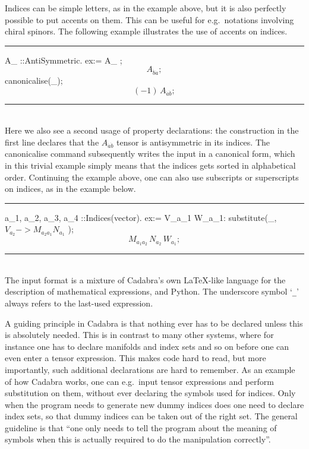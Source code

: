 \documentclass[11pt]{article}
\newcommand{\toprule}{\par\vspace{1ex}\noindent\hspace{25pt}\rule{435pt}{.1pt}}
\newcommand{\botrule}{\noindent\hspace{25pt}\rule{435pt}{.1pt}\\[2ex]}
\newenvironment{cdbin}{\fvset{firstnumber=1}\color[named]{Blue}\Verbatim}{\endVerbatim}
\newenvironment{cdbcont}{\fvset{firstnumber=last}\color[named]{Blue}\Verbatim}{\endVerbatim}
\newenvironment{cdbout}{\vspace{-1.4ex}\begin{equation}}{\end{equation}\vspace{-1.4ex}}
\newcommand{\Cdb}{{Cadabra}\xspace}
\begin{document}
Indices can be simple letters, as in the example above, but it is also
perfectly possible to put accents on them. This can be useful for
e.g.~notations involving chiral spinors. The following example
illustrates the use of accents on indices.
\toprule
\begin{cdbin}
A_{ }::AntiSymmetric.
ex:= A_{ };
\end{cdbin}
\begin{cdbout}
A_{\dot{b} \dot{a}};
\end{cdbout}
\begin{cdbcont}
canonicalise(_);
\end{cdbcont}
\begin{cdbout}
(-1)\,A_{\dot{a} \dot{b}};
\end{cdbout}
\botrule Here we also see a second usage of property declarations: the
construction in the first line declares that the $A_{\dot{a} \dot{b}}$
tensor is antisymmetric in its indices. The canonicalise command
subsequently writes the input in a canonical form, which in this
trivial example simply means that the indices gets sorted in
alphabetical order.  Continuing the example above, one can also use
subscripts or superscripts on indices, as in the example below.
\vfill\eject
\toprule
\begin{cdbin}
{ a_{1}, a_{2}, a_{3}, a_{4} }::Indices(vector).
ex:= V_{a_{1}} W_{a_{1}}:
substitute(_, $V_{a_{2}} -> M_{a_{2} a_{1}} N_{a_{1}}$ );
\end{cdbin}
\begin{cdbout}
M_{a_{1} a_{2}} \, N_{a_{2}} \, W_{a_{1}};
\end{cdbout}
\botrule
The input format is a mixture of Cadabra's own LaTeX-like language for
the description of mathematical expressions, and Python. The
underscore symbol `\verb|_|' always refers to the last-used expression.

A guiding principle in \Cdb is that nothing ever has to be declared
unless this is absolutely needed. This is in contrast to many other
systems, where for instance one has to declare manifolds and index
sets and so on before one can even enter a tensor expression. This
makes code hard to read, but more importantly, such additional
declarations are hard to remember. As an example of how \Cdb works,
one can e.g.~input tensor expressions and perform substitution on them,
without ever declaring the symbols used for indices. Only when the
program needs to generate new dummy indices does one need to declare
index sets, so that dummy indices can be taken out of the right
set. The general guideline is that ``one only
needs to tell the program about the meaning of symbols when this is
actually required to do the manipulation correctly''.
\end{document}
